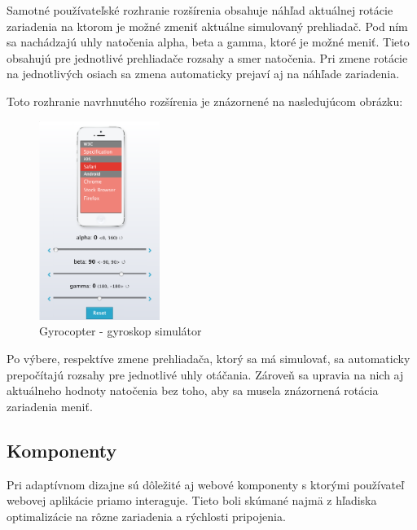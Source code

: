 Samotné používateľské rozhranie rozšírenia obsahuje náhľad aktuálnej rotácie zariadenia na ktorom je možné zmeniť aktuálne simulovaný prehliadač. Pod ním sa nachádzajú uhly natočenia alpha, beta a gamma, ktoré je možné meniť. Tieto obsahujú pre jednotlivé prehliadače rozsahy a smer natočenia. Pri zmene rotácie na jednotlivých osiach sa zmena automaticky prejaví aj na náhľade zariadenia. 

Toto rozhranie navrhnutého rozšírenia je znázornené na nasledujúcom obrázku:

\begin{figure}[H]
  \centering
  \includegraphics[width=0.35\textwidth]{img/gyrocopter.png}
  \caption[Gyrocopter - gyroskop simulátor]{
    Gyrocopter - gyroskop simulátor}
  \label{fig: gyrocopter}
\end{figure}

Po výbere, respektíve zmene prehliadača, ktorý sa má simulovať, sa automaticky prepočítajú rozsahy pre jednotlivé uhly otáčania. Zároveň sa upravia na nich aj aktuálneho hodnoty natočenia bez toho, aby sa musela znázornená rotácia zariadenia meniť.





\subsection{Komponenty} %
\label{sub:komponenty}

Pri adaptívnom dizajne sú dôležité aj webové komponenty s ktorými používateľ webovej aplikácie priamo interaguje. Tieto boli skúmané najmä z hľadiska optimalizácie na rôzne zariadenia a rýchlosti pripojenia.

